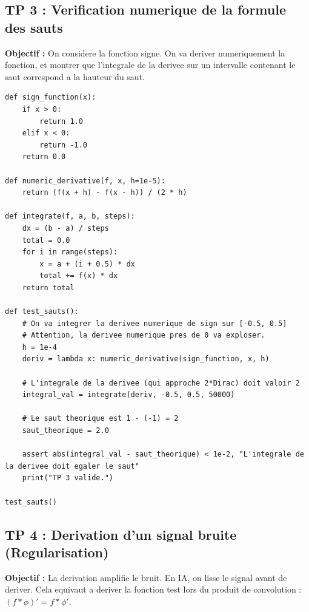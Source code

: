 \documentclass[11pt,a4paper]{article}
\begin{document}
\subsection*{TP 3 : Verification numerique de la formule des sauts }
\textbf{Objectif :} On considere la fonction signe. On va deriver numeriquement la fonction, et montrer que l'integrale de la derivee sur un intervalle contenant le saut correspond a la hauteur du saut.

\begin{lstlisting}
def sign_function(x):
    if x > 0:
        return 1.0
    elif x < 0:
        return -1.0
    return 0.0

def numeric_derivative(f, x, h=1e-5):
    return (f(x + h) - f(x - h)) / (2 * h)

def integrate(f, a, b, steps):
    dx = (b - a) / steps
    total = 0.0
    for i in range(steps):
        x = a + (i + 0.5) * dx
        total += f(x) * dx
    return total

def test_sauts():
    # On va integrer la derivee numerique de sign sur [-0.5, 0.5]
    # Attention, la derivee numerique pres de 0 va exploser.
    h = 1e-4
    deriv = lambda x: numeric_derivative(sign_function, x, h)

    # L'integrale de la derivee (qui approche 2*Dirac) doit valoir 2
    integral_val = integrate(deriv, -0.5, 0.5, 50000)

    # Le saut theorique est 1 - (-1) = 2
    saut_theorique = 2.0

    assert abs(integral_val - saut_theorique) < 1e-2, "L'integrale de la derivee doit egaler le saut"
    print("TP 3 valide.")

test_sauts()
\end{lstlisting}

\subsection*{TP 4 : Derivation d'un signal bruite (Regularisation) }
\textbf{Objectif :} La derivation amplifie le bruit. En IA, on lisse le signal avant de deriver. Cela equivaut a deriver la fonction test lors du produit de convolution : $(f * \phi)' = f * \phi'$.
\end{document}
